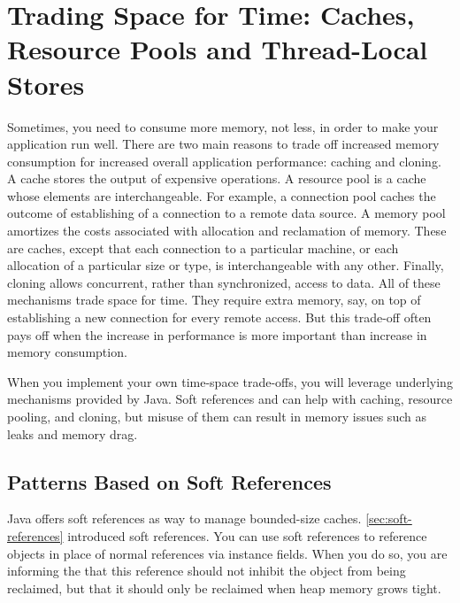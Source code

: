 \chapter[Trading Space for Time]{Trading Space for Time: Caches, Resource Pools and Thread-Local
Stores}
\label{chapter:trading-space-for-time}

Sometimes, you need to consume more memory, not less, in order to make your
application run well. There are two main reasons to trade off increased memory
consumption for increased overall application performance: caching and cloning.
A cache stores the output of expensive operations. A resource pool is a cache
whose elements are interchangeable. For example, a connection pool caches the
outcome of establishing of a connection to a remote data source. A memory pool
amortizes the costs associated with allocation and reclamation of memory. These
are caches, except that each connection to a particular machine, or each
allocation of a particular size or type, is interchangeable with any other.
Finally, cloning allows concurrent, rather than synchronized, access to data.
All of these mechanisms trade space for time. They require extra memory, say, on
top of establishing a new connection for every remote access. But this trade-off
often pays off when the increase in performance is more important than increase
in memory consumption.

When you implement your own time-space trade-offs, you will leverage underlying
mechanisms provided by Java. Soft references and \tls can help with caching,
resource pooling, and cloning, but misuse of them can result in memory issues
such as leaks and memory drag.


\section{Patterns Based on Soft References}
\label{sec:soft-reference-details}

Java offers soft references as way to manage bounded-size caches.
\autoref{sec:soft-references} introduced soft references. You can use soft
references to reference objects in place of normal references via instance
fields. When you do so, you are informing the \jre that this reference should
not inhibit the object from being reclaimed, but that it should only be
reclaimed when heap memory grows tight.

